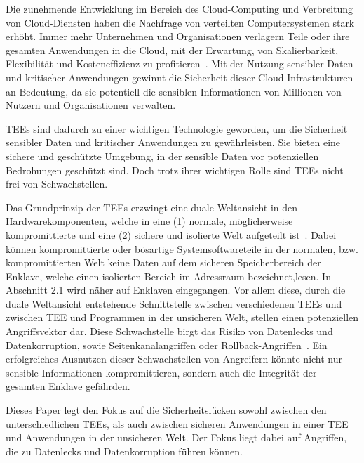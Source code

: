 Die zunehmende Entwicklung im Bereich des Cloud-Computing und Verbreitung von Cloud-Diensten haben die Nachfrage von verteilten Computersystemen stark erhöht. 
Immer mehr Unternehmen und Organisationen verlagern Teile oder ihre gesamten Anwendungen in die Cloud, mit der Erwartung, von Skalierbarkeit, Flexibilität und Kosteneffizienz zu profitieren~\cite{Cloud}. 
Mit der Nutzung sensibler Daten und kritischer Anwendungen gewinnt die Sicherheit dieser Cloud-Infrastrukturen an Bedeutung, da sie potentiell die sensiblen Informationen von Millionen von Nutzern und Organisationen verwalten.

TEEs sind dadurch zu einer wichtigen Technologie geworden, um die Sicherheit sensibler Daten und kritischer Anwendungen zu gewährleisten. 
Sie bieten eine sichere und geschützte Umgebung, in der sensible Daten vor potenziellen Bedrohungen geschützt sind. Doch trotz ihrer wichtigen Rolle sind TEEs nicht frei von Schwachstellen. 

Das Grundprinzip der TEEs erzwingt eine duale Weltansicht in den Hardwarekomponenten, welche in eine (1) normale, möglicherweise kompromittierte und eine (2) sichere und isolierte Welt aufgeteilt ist~\cite{TEEPaper}. 
Dabei können kompromittierte oder bösartige Systemsoftwareteile in der normalen, bzw. kompromittierten Welt keine Daten auf dem sicheren Speicherbereich der Enklave, welche einen isolierten Bereich im Adressraum bezeichnet,lesen. In Abschnitt 2.1 wird näher auf Enklaven eingegangen. Vor allem diese, durch die duale Weltansicht entstehende Schnittstelle zwischen verschiedenen TEEs und zwischen TEE und Programmen in der unsicheren Welt, stellen einen potenziellen Angriffsvektor dar.
Diese Schwachstelle birgt das Risiko von Datenlecks und Datenkorruption, sowie Seitenkanalangriffen oder Rollback-Angriffen~\cite{Memory, TEEPaper}. Ein erfolgreiches Ausnutzen dieser Schwachstellen von Angreifern könnte nicht nur sensible Informationen kompromittieren, sondern auch die Integrität der gesamten Enklave gefährden. 

Dieses Paper legt den Fokus auf die Sicherheitslücken sowohl zwischen den unterschiedlichen TEEs, als auch zwischen sicheren Anwendungen in einer TEE und Anwendungen in der unsicheren Welt. Der Fokus liegt dabei auf Angriffen, die zu Datenlecks und Datenkorruption führen können.